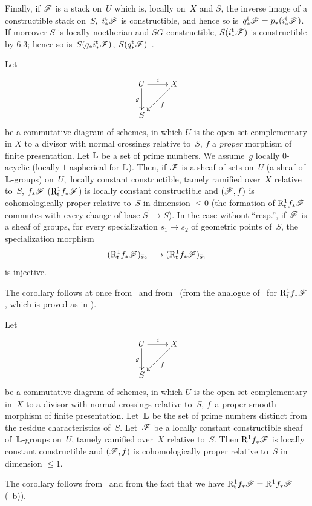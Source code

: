 Finally, if $\cal{ F}$ is a stack on~$U$ which is, locally on~$X$ and
$S$, the inverse image of a constructible stack on~$S,$
$i_*^{\tame}\cal{ F}$ is constructible, and hence so
is~$q_*^{\tame}\cal{ F}=p_*(i_*^{\tame}\cal{ F})$. If
moreover $S$ is locally noetherian and $SG$ constructible,
$S(i_*^{\tame}\cal{ F})$ is constructible by 6.3; hence
so is~$S(q_*i_*^{\tame}\cal{ F})$, \ie
$S(q_*^{\tame}\cal{ F})$~.

\begin{corollary}
\label{XIII.2.8}
Let
$$
\xymatrix{ U \ar[r]^{i} \ar[d]_{g} & X \ar[ld]^{f} \\ S }
$$
be a commutative diagram of schemes, in which $U$ is the open set
complementary
in $X$ to a divisor with normal crossings relative to~$S$, $f$ a \emph {proper} morphism of finite presentation. Let
$\mathbb{L}$ be a set of prime numbers. We assume~$g$ locally
$0$-acyclic (\resp locally $1$-aspherical for $\mathbb{L}$). Then, if
$\cal{ F}$ is a sheaf of sets on~$U$ (\resp a sheaf of
$\mathbb{L}$-groups) on~$U,$ locally constant constructible,
tamely ramified over~$X$ relative to~$S$,
$f_*\cal{ F}$ (\resp $\R^1_{\tame}f_*\cal{ F}$) is locally
constant constructible and $(\cal{ F},f)$ is cohomologically proper
relative to~$S$ in dimension $\leq 0$ (\resp the formation of
$\R^1_{\tame}f_*\cal{ F}$ commutes with every change of base
$S^{'}\to S$). In the case without ``resp.'', if $\cal{ F}$ is a
sheaf of groups, for every specialization $\overline{s}_1
\to \overline{s}_2$ of geometric points of~$S$, the
specialization morphism
$$
(\R^1_{\tame}f_*\cal{ F})_{\overline{s}_2}\to
(\R^1_{\tame}f_*\cal{ F})_{\overline{s}_1}
$$
is injective.
\end{corollary}
The corollary follows at once from~ and
from~ (\resp from the analogue of~ for
$\R^1_{\tame}f_*\cal{ F}$, which is proved as in \loccit).

\begin{corollary} \label{XIII.2.9}
Let
$$
\xymatrix{ U \ar[r]^{i} \ar[d]_{g} & X \ar[ld]^{f} \\ S }
$$
be a commutative diagram of schemes, in which $U$ is the open set
complementary in~$X$ to a divisor with normal crossings
relative to~$S$, $f$~a proper smooth morphism of
finite presentation. Let~$\mathbb{L} $ be the set of prime numbers
distinct from the residue characteristics of~$S$. Let~$\cal{F}$ be a locally constant constructible sheaf of~$\mathbb{L} $-groups
on~$U$, tamely ramified over~$X$ relative
to~$S$. Then $\R^1 f_*\cal{ F}$ is locally constant
constructible and $(\cal{ F},f)$ is cohomologically proper
relative
to~$S$ in dimension $\leq 1$.
\end{corollary}
The corollary follows from~ and from the fact that we have
$\R_{\tame}^1f_*\cal{ F}=\R^1f_*\cal{ F}$ (~b)).
